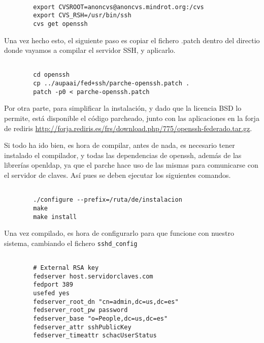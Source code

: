         \begin{verbatim}

        export CVSROOT=anoncvs@anoncvs.mindrot.org:/cvs
        export CVS_RSH=/usr/bin/ssh
        cvs get openssh

        \end{verbatim}

        Una vez hecho esto, el siguiente paso es copiar el fichero
        .patch dentro del directio donde vayamos a compilar el
        servidor SSH, y aplicarlo.

        \begin{verbatim}
        
        cd openssh
        cp ../aupaai/fed+ssh/parche-openssh.patch .
        patch -p0 < parche-openssh.patch

        \end{verbatim}

        Por otra parte, para simplificar la instalación, y dado que la
        licencia BSD lo permite, está disponible el código parcheado,
        junto con las aplicaciones en la forja de rediris
        \url{http://forja.rediris.es/frs/download.php/775/openssh-federado.tar.gz}.

        Si todo ha ido bien, es hora de compilar, antes de nada, es
        necesario tener instalado el compilador, y todas las
        dependencias de openssh, además de las librerías openldap, ya
        que el parche hace uso de las mismas para comunicarse con el
        servidor de claves. Así pues se deben ejecutar los siguientes
        comandos.

        \begin{verbatim}

        ./configure --prefix=/ruta/de/instalacion
        make
        make install

        \end{verbatim}

        Una vez compilado, es hora de configurarlo para que funcione
        con nuestro sistema, cambiando el fichero \texttt{sshd\_config}

        \begin{verbatim}

        # External RSA key
        fedserver host.servidorclaves.com
        fedport 389
        usefed yes
        fedserver_root_dn "cn=admin,dc=us,dc=es"
        fedserver_root_pw password
        fedserver_base "o=People,dc=us,dc=es"
        fedserver_attr sshPublicKey
        fedserver_timeattr schacUserStatus

        \end{verbatim}

